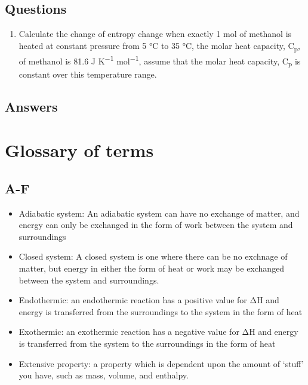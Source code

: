 \documentclass[
]{book}
\providecommand{\tightlist}{%
  \setlength{\itemsep}{0pt}\setlength{\parskip}{0pt}}
\begin{document}
\hypertarget{sec:w3p2question}{%
\section{Questions}\label{sec:w3p2question}}

\begin{enumerate}
\def\labelenumi{\arabic{enumi}.}
\tightlist
\item
  Calculate the change of entropy change when exactly 1 mol of methanol is heated at constant pressure from 5 °C to 35 °C, the molar heat capacity, C\textsubscript{p}, of methanol is 81.6 J K\textsuperscript{−1} mol\textsuperscript{−1}, assume that the molar heat capacity, C\textsubscript{p} is constant over this temperature range.
\end{enumerate}

\hypertarget{sec:w3p2ans}{%
\section{Answers}\label{sec:w3p2ans}}

\hypertarget{glossary-of-terms}{%
\chapter*{Glossary of terms}\label{glossary-of-terms}}

\hypertarget{a-f}{%
\section*{A-F}\label{a-f}}

\begin{itemize}
\item
  Adiabatic system: An adiabatic system can have no exchange of matter, and energy can only be exchanged in the form of work between the system and surroundings
\item
  Closed system: A closed system is one where there can be no exchnage of matter, but energy in either the form of heat or work may be exchanged between the system and surroundings.
\item
  Endothermic: an endothermic reaction has a positive value for ΔH and energy is transferred from the surroundings to the system in the form of heat
\item
  Exothermic: an exothermic reaction has a negative value for ΔH and energy is transferred from the system to the surroundings in the form of heat
\item
  Extensive property: a property which is dependent upon the amount of `stuff' you have, such as mass, volume, and enthalpy.
\end{itemize}
\end{document}
